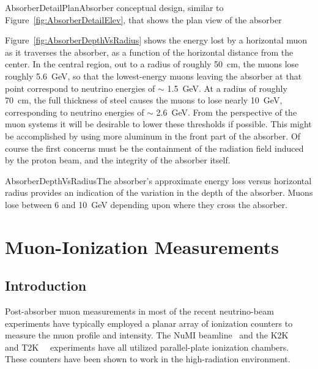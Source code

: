 \begin{cdrfigure}{AbsorberDetailPlan}{Absorber conceptual design, 
similar to Figure~\ref{fig:AbsorberDetailElev}, that 
shows the plan view of the absorber}

\end{cdrfigure}

Figure~\ref{fig:AbsorberDepthVsRadius} shows the energy lost by a
horizontal muon as it traverses the absorber, as a function of the
horizontal distance from the center. In the central region, out to a
radius of roughly 50~cm, the muons lose roughly 5.6~GeV, so that the
lowest-energy muons leaving the absorber at that point correspond to
neutrino energies of $\sim$ 1.5~GeV. At a radius of roughly 70~cm, the
full thickness of steel causes the muons to lose nearly 10~GeV,
corresponding to neutrino energies of $\sim$ 2.6~GeV. From the
perspective of the muon systems it will be desirable to lower these
thresholds if possible. This might be accomplished by using more
aluminum in the front part of the absorber. Of course the first
concerns must be the containment of the radiation field induced by the
proton beam, and the integrity of the absorber itself. 

\begin{cdrfigure}{AbsorberDepthVsRadius}{The absorber's approximate
energy loss versus horizontal radius provides an indication of the variation in 
the depth of the absorber. Muons lose between 6 and 10~GeV depending upon where they cross the absorber.}
\end{cdrfigure}

\section{Muon-Ionization Measurements}

\subsection{Introduction}

Post-absorber muon measurements in most of the recent neutrino-beam
experiments have typically employed a planar array of ionization
counters to measure the muon profile and intensity. The 
NuMI beamline~\cite{ref:NuMIBeamMonitors} and the K2K~\cite{ref:K2K}~\cite{ref:Maruyama}
and T2K~\cite{ref:T2KMuIon}~\cite{ref:T2KMuMon} experiments have all
utilized parallel-plate ionization chambers. These counters have been
shown to work in the high-radiation environment. 

